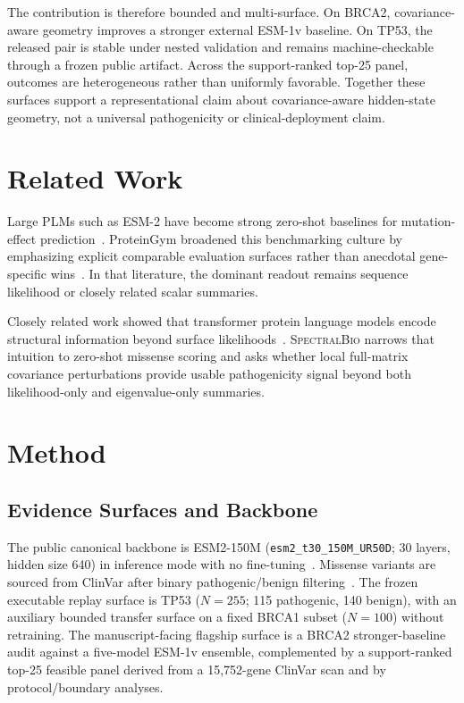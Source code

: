 \documentclass[10pt,twocolumn,letterpaper]{article}
\newcommand{\methodname}{\textsc{SpectralBio}}
\begin{document}
The contribution is therefore bounded and multi-surface. On BRCA2, covariance-aware
geometry improves a stronger external ESM-1v baseline. On TP53, the released pair is
stable under nested validation and remains machine-checkable through a frozen public
artifact. Across the support-ranked top-25 panel, outcomes are heterogeneous rather
than uniformly favorable. Together these surfaces support a representational claim
about covariance-aware hidden-state geometry, not a universal pathogenicity or
clinical-deployment claim.

\section{Related Work}\label{sec:related}

Large PLMs such as ESM-2 have become strong zero-shot baselines for mutation-effect
prediction~\cite{lin2023evolutionary,meier2021language}. ProteinGym broadened this
benchmarking culture by emphasizing explicit comparable evaluation surfaces rather
than anecdotal gene-specific wins~\cite{notin2023proteingym}. In that literature,
the dominant readout remains sequence likelihood or closely related scalar summaries.

Closely related work showed that transformer protein language models encode structural
information beyond surface likelihoods~\cite{rao2021structure}. \methodname{} narrows
that intuition to zero-shot missense scoring and asks whether local full-matrix
covariance perturbations provide usable pathogenicity signal beyond both
likelihood-only and eigenvalue-only summaries.

\section{Method}\label{sec:method}

\subsection{Evidence Surfaces and Backbone}

The public canonical backbone is ESM2-150M
(\texttt{esm2\_t30\_150M\_UR50D}; 30 layers, hidden size 640) in inference mode
with no fine-tuning~\cite{lin2023evolutionary}. Missense variants are sourced from
ClinVar after binary pathogenic/benign filtering~\cite{landrum2018clinvar}. The
frozen executable replay surface is TP53 ($N=255$; 115 pathogenic, 140 benign),
with an auxiliary bounded transfer surface on a fixed BRCA1 subset ($N=100$) without
retraining. The manuscript-facing flagship surface is a BRCA2 stronger-baseline audit
against a five-model ESM-1v ensemble, complemented by a support-ranked top-25 feasible
panel derived from a 15,752-gene ClinVar scan and by protocol/boundary analyses.
\end{document}

